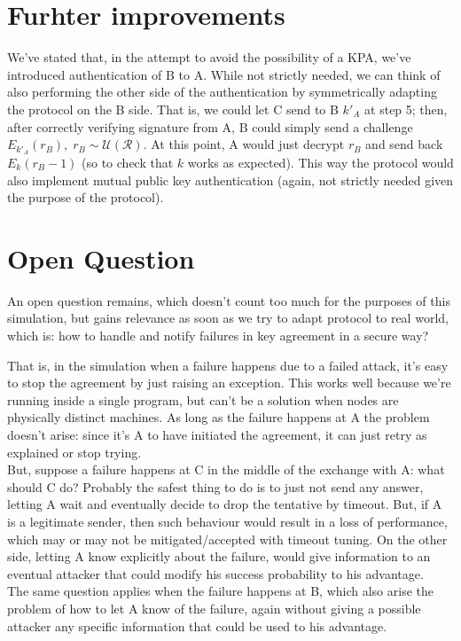 \documentclass[a4paper,12pt,titlepage]{article}
\begin{document}
\section{Furhter improvements}
We've stated that, in the attempt to avoid the possibility of a KPA, we've
introduced authentication of B to A. While not strictly needed, we can think of
also performing the other side of the authentication by symmetrically adapting
the protocol on the B side. That is, we could let C send to B $k'_A$ at step 5;
then, after correctly verifying signature from A, B could simply send a
challenge $E_{k'_A}(r_B),\; r_B \sim \mathcal{U}(\mathcal{R})$. At this point,
A would just decrypt $r_B$ and send back $E_k(r_B - 1)$ (so to check that $k$
works as expected). This way the protocol would also implement mutual public
key authentication (again, not strictly needed given the purpose of the
protocol).

\section{Open Question}
An open question remains, which doesn't count too much for the purposes of this
simulation, but gains relevance as soon as we try to adapt protocol to real
world, which is: how to handle and notify failures in key agreement in a secure
way?

That is, in the simulation when a failure happens due to a failed attack, it's
easy to stop the agreement by just raising an exception. This works well
because we're running inside a single program, but can't be a solution when
nodes are physically distinct machines. As long as the failure happens at A
the problem doesn't arise: since it's A to have
initiated the agreement, it can just retry as explained or stop trying. \\
But, suppose a failure happens at C in the middle of the exchange with A: what
should C do? Probably the safest thing to do is to just not send any answer,
letting A wait and eventually decide to drop the tentative by timeout. But, if
A is a legitimate sender, then such behaviour would result in a loss of
performance, which may or may not be mitigated/accepted with timeout tuning. On
the other side, letting A know explicitly about the failure, would give
information to an eventual attacker that could modify his success probability
to his advantage. \\
The same question applies when the failure happens at B, which also arise the
problem of how to let A know of the failure, again without giving a possible
attacker any specific information that could be used to his advantage.
\end{document}
